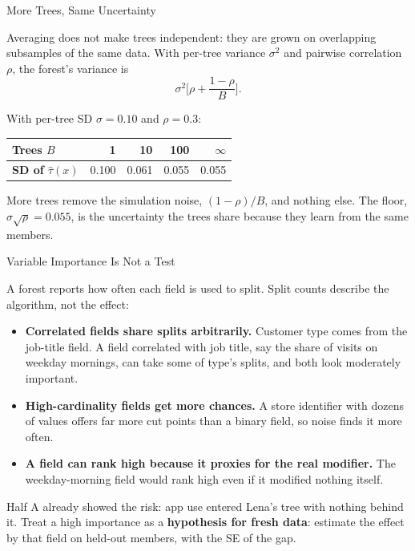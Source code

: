 \documentclass[aspectratio=169, 11pt, handout]{beamer}
\newcommand{\hatt}{\hat{\tau}}
\begin{document}
\begin{frame}{More Trees, Same Uncertainty}

Averaging does not make trees independent: they are grown on overlapping subsamples of the same data. With per-tree variance $\sigma^2$ and pairwise correlation $\rho$, the forest's variance is
\[
\sigma^2\Big[\rho + \frac{1-\rho}{B}\Big].
\]

With per-tree SD $\sigma = 0.10$ and $\rho = 0.3$:

\begin{center}
\begin{tabular}{lrrrr}
\toprule
\textbf{Trees $B$} & 1 & 10 & 100 & $\infty$ \\
\midrule
\textbf{SD of $\hatt(x)$} & 0.100 & 0.061 & 0.055 & 0.055 \\
\bottomrule
\end{tabular}
\end{center}

\bigskip

More trees remove the simulation noise, $(1-\rho)/B$, and nothing else. The floor, $\sigma\sqrt\rho = 0.055$, is the uncertainty the trees share because they learn from the same members.
\end{frame}

\begin{frame}{Variable Importance Is Not a Test}

A forest reports how often each field is used to split. Split counts describe the algorithm, not the effect:

\bigskip

\begin{itemize}
  \item \textbf{Correlated fields share splits arbitrarily.} Customer type comes from the job-title field. A field correlated with job title, say the share of visits on weekday mornings, can take some of type's splits, and both look moderately important.
  \item \textbf{High-cardinality fields get more chances.} A store identifier with dozens of values offers far more cut points than a binary field, so noise finds it more often.
  \item \textbf{A field can rank high because it proxies for the real modifier.} The weekday-morning field would rank high even if it modified nothing itself.
\end{itemize}

\bigskip

Half A already showed the risk: app use entered Lena's tree with nothing behind it. Treat a high importance as a \textbf{hypothesis for fresh data}: estimate the effect by that field on held-out members, with the SE of the gap.
\end{frame}
\end{document}
